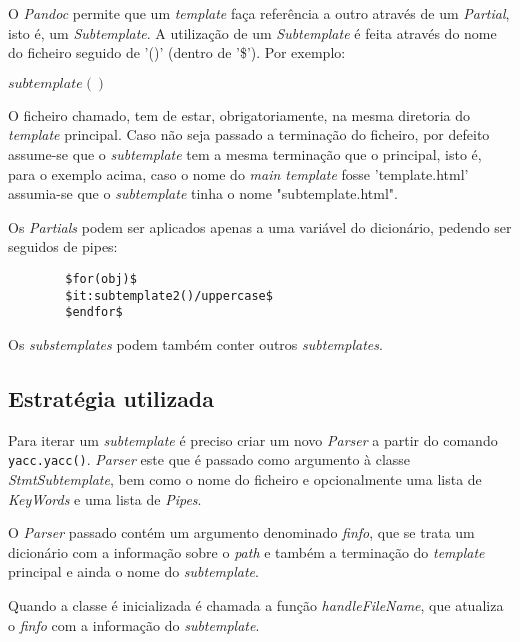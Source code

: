 \documentclass[../relatorio.tex]{subfiles}
\begin{document}
    O \textit{Pandoc} permite que um \textit{template} faça referência a outro
    através de um \textit{Partial}, isto é, um \textit{Subtemplate}. A utilização
    de um \textit{Subtemplate} é feita através do nome do ficheiro seguido de '()'
    (dentro de '\$'). Por exemplo:

    \texttt{$subtemplate()$}

    O ficheiro chamado, tem de estar, obrigatoriamente, na mesma diretoria do \textit{template}
    principal. Caso não seja passado a terminação do ficheiro, por defeito assume-se que o
    \textit{subtemplate} tem a mesma terminação que o principal, isto é, para o exemplo acima, caso o nome do
    \textit{main template} fosse 'template.html' assumia-se que o \textit{subtemplate} tinha o nome "subtemplate.html".
    
    Os \textit{Partials} podem ser aplicados apenas a uma variável do dicionário, pedendo ser seguidos de pipes:

    \begin{verbatim}
        $for(obj)$
        $it:subtemplate2()/uppercase$
        $endfor$
    \end{verbatim}

    Os \textit{substemplates} podem também conter outros \textit{subtemplates}.

    \subsection*{Estratégia utilizada}

    Para iterar um \textit{subtemplate} é preciso criar um novo \textit{Parser} a partir do
    comando \texttt{yacc.yacc()}. \textit{Parser} este que é passado como argumento
    à classe \textit{StmtSubtemplate}, bem como o nome do ficheiro e opcionalmente uma lista
    de \textit{KeyWords} e uma lista de \textit{Pipes}. 
    
    O \textit{Parser} passado contém um argumento denominado \textit{finfo}, que se trata um dicionário com a informação
    sobre o \textit{path} e também a terminação do \textit{template} principal e ainda o nome do \textit{subtemplate}. 

    Quando a classe é inicializada é chamada a função \textit{handleFileName}, que atualiza o \textit{finfo} com a 
    informação do \textit{subtemplate}.

    \inputminted[firstline=14, lastline=21]{python}{../modules/Stmt/StmtSubtemplate.py}
\end{document}
